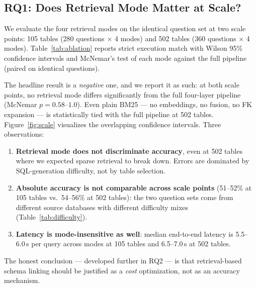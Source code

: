 \documentclass[conference]{IEEEtran}
\begin{document}
\subsection{RQ1: Does Retrieval Mode Matter at Scale?}
\label{sec:rq_ablation}

We evaluate the four retrieval modes on the identical question set at
two scale points: 105 tables (280 questions $\times$ 4 modes) and 502
tables (360 questions $\times$ 4 modes). Table~\ref{tab:ablation}
reports strict execution match with Wilson 95\% confidence intervals
and McNemar's test of each mode against the full pipeline (paired on
identical questions).

\begin{table}[!htb]
\caption{Two-Scale Retrieval Ablation: Strict Execution Match by Mode
(v2 gold sets, caches disabled; McNemar's test vs.\ the full pipeline)}
\label{tab:ablation}
\centering
\resizebox{\columnwidth}{!}{}
\end{table}

The headline result is a \emph{negative} one, and we report it as such:
at both scale points, no retrieval mode differs significantly from the
full four-layer pipeline (McNemar $p = 0.58$--$1.0$). Even plain
BM25 --- no embeddings, no fusion, no FK expansion --- is statistically
tied with the full pipeline at 502 tables. Figure~\ref{fig:scale}
visualizes the overlapping confidence intervals. Three observations:

\begin{enumerate}
  \item \textbf{Retrieval mode does not discriminate accuracy}, even at
        502 tables where we expected sparse retrieval to break down.
        Errors are dominated by SQL-generation difficulty, not by table
        selection.
  \item \textbf{Absolute accuracy is not comparable across scale
        points} (51--52\% at 105 tables vs.\ 54--56\% at 502 tables):
        the two question sets come from different source databases with
        different difficulty mixes (Table~\ref{tab:difficulty}).
  \item \textbf{Latency is mode-insensitive as well}: median end-to-end
        latency is 5.5--6.0\,s per query across modes at 105 tables and
        6.5--7.0\,s at 502 tables.
\end{enumerate}

The honest conclusion --- developed further in RQ2 --- is that
retrieval-based schema linking should be justified as a \emph{cost}
optimization, not as an accuracy mechanism.
\end{document}
